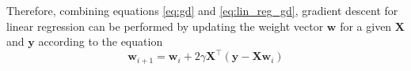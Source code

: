\documentclass{article}
\begin{document}
Therefore, combining equations \eqref{eq:gd} and \eqref{eq:lin_reg_gd}, gradient descent for linear regression can be performed by updating the weight vector $\mathbf{w}$ for a given $\mathbf{X}$ and $\mathbf{y}$ according to the equation
\begin{equation}
    \mathbf{w}_{i+1} = \mathbf{w}_i + 2\gamma\mathbf{X}^\top(\mathbf{y} - \mathbf{X}\mathbf{w}_i)
\end{equation}
\end{document}

